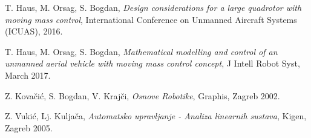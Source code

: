 \documentclass[11pt,a4paper]{article}
\begin{document}
\begin{thebibliography}{9}
  T. Haus, M. Orsag, S. Bogdan,
  \emph{Design considerations for a large quadrotor with moving mass control},
  International Conference on Unmanned Aircraft Systems (ICUAS),
  2016.
 
  T. Haus, M. Orsag, S. Bogdan,
  \emph{Mathematical modelling and control of an unmanned aerial vehicle with moving mass control concept},
  J Intell Robot Syst,
  March 2017. 
  
  Z. Kovačić, S. Bogdan, V. Krajči,
  \emph{Osnove Robotike},
  Graphis,
  Zagreb 2002.
 
  Z. Vukić, Lj. Kuljača,
  \emph{Automatsko upravljanje - Analiza linearnih sustava},
  Kigen,
  Zagreb 2005.
  

  
  
\end{thebibliography}
\end{document}
